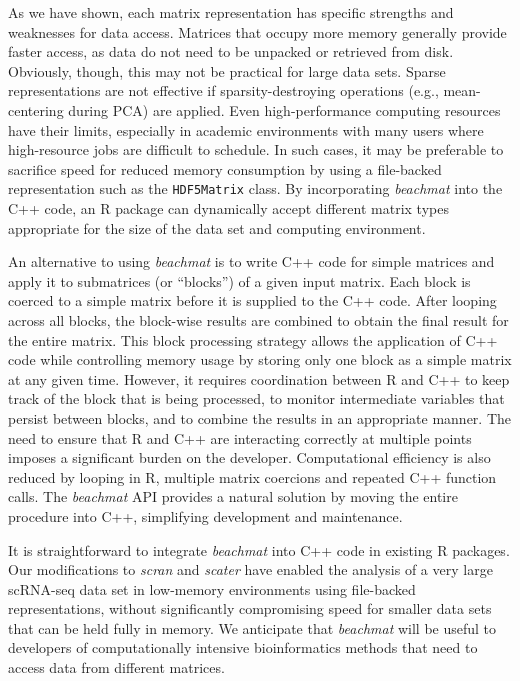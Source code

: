\documentclass[10pt,letterpaper]{article}
\newcommand{\beachmat}{\textit{beachmat}}
\newcommand{\code}[1]{\texttt{#1}}
\begin{document}
As we have shown, each matrix representation has specific strengths and weaknesses for data access.
Matrices that occupy more memory generally provide faster access, as data do not need to be unpacked or retrieved from disk.
Obviously, though, this may not be practical for large data sets.
Sparse representations are not effective if sparsity-destroying operations (e.g., mean-centering during PCA) are applied.
Even high-performance computing resources have their limits, especially in academic environments with many users where high-resource jobs are difficult to schedule.
In such cases, it may be preferable to sacrifice speed for reduced memory consumption by using a file-backed representation such as the \code{HDF5Matrix} class.
By incorporating \beachmat{} into the C++ code, an R package can dynamically accept different matrix types appropriate for the size of the data set and computing environment.

An alternative to using \beachmat{} is to write C++ code for simple matrices and apply it to submatrices (or ``blocks'') of a given input matrix.
Each block is coerced to a simple matrix before it is supplied to the C++ code.
After looping across all blocks, the block-wise results are combined to obtain the final result for the entire matrix.
This block processing strategy allows the application of C++ code while controlling memory usage by storing only one block as a simple matrix at any given time.
However, it requires coordination between R and C++ to keep track of the block that is being processed, to monitor intermediate variables that persist between blocks, and to combine the results in an appropriate manner.
The need to ensure that R and C++ are interacting correctly at multiple points imposes a significant burden on the developer.
Computational efficiency is also reduced by looping in R, multiple matrix coercions and repeated C++ function calls.
The \beachmat{} API provides a natural solution by moving the entire procedure into C++, simplifying development and maintenance.

It is straightforward to integrate \beachmat{} into C++ code in existing R packages.
Our modifications to \textit{scran} and \textit{scater} have enabled the analysis of a very large scRNA-seq data set in low-memory environments using file-backed representations, without significantly compromising speed for smaller data sets that can be held fully in memory.
We anticipate that \beachmat{} will be useful to developers of computationally intensive bioinformatics methods that need to access data from different matrices.
\end{document}
